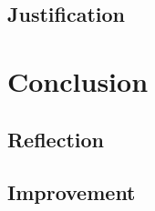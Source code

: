 \documentclass[a4paper,12pt,nottoc]{article}
\begin{document}
\subsection{Justification}

\section{Conclusion}

\subsection{Reflection}

\subsection{Improvement}
\end{document}

